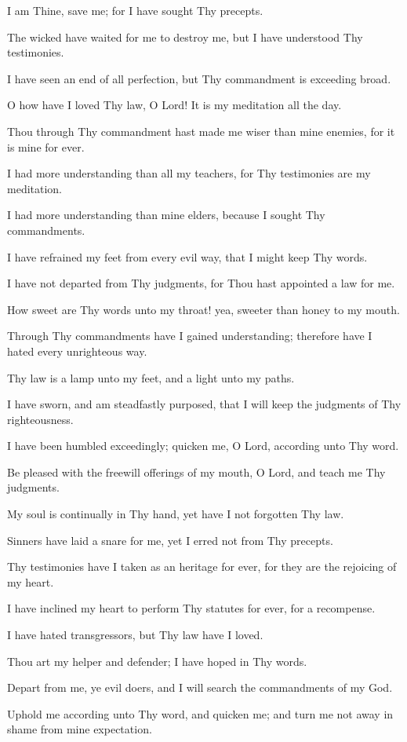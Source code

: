 I am Thine, save me; for I have sought Thy precepts.

The wicked have waited for me to destroy me, but I have understood Thy testimonies.

I have seen an end of all perfection, but Thy commandment is exceeding broad.

O how have I loved Thy law, O Lord! It is my meditation all the day.

Thou through Thy commandment hast made me wiser than mine enemies, for it is mine for ever.

I had more understanding than all my teachers, for Thy testimonies are my meditation.

I had more understanding than mine elders, because I sought Thy commandments.

I have refrained my feet from every evil way, that I might keep Thy words.

I have not departed from Thy judgments, for Thou hast appointed a law for me.

How sweet are Thy words unto my throat! yea, sweeter than honey to my mouth.

Through Thy commandments have I gained understanding; therefore have I hated every unrighteous way.

Thy law is a lamp unto my feet, and a light unto my paths.

I have sworn, and am steadfastly purposed, that I will keep the judgments of Thy righteousness.

I have been humbled exceedingly; quicken me, O Lord, according unto Thy word.

Be pleased with the freewill offerings of my mouth, O Lord, and teach me Thy judgments.

My soul is continually in Thy hand, yet have I not forgotten Thy law.

Sinners have laid a snare for me, yet I erred not from Thy precepts.

Thy testimonies have I taken as an heritage for ever, for they are the rejoicing of my heart.

I have inclined my heart to perform Thy statutes for ever, for a recompense.

I have hated transgressors, but Thy law have I loved.

Thou art my helper and defender; I have hoped in Thy words.

Depart from me, ye evil doers, and I will search the commandments of my God.

Uphold me according unto Thy word, and quicken me; and turn me not away in shame from mine expectation.

